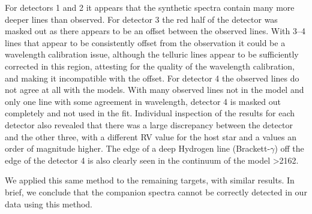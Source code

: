For detectors 1 and 2 it appears that the synthetic spectra contain many more deeper lines than observed.
For detector 3 the red half of the detector was masked out as there appears to be an offset between the observed lines.
With 3--4 lines that appear to be consistently offset from the observation it could be a wavelength calibration issue, although the telluric lines appear to be sufficiently corrected in this region, attesting for the quality of the wavelength calibration, and making it incompatible with the offset.
For detector 4 the observed lines do not agree at all with the models.
With many observed lines not in the model and only one line with some agreement in wavelength, detector 4 is masked out completely and not used in the \textchisquared{} fit.
Individual inspection of the \textchisquared{} results for each detector also revealed that there was a large discrepancy between the  detector and the other three, with a different {RV} value for the host star and a \textchisquared{} values an order of magnitude higher.
The edge of a deep Hydrogen line (Brackett-\(\gamma\)) off the edge of the detector 4 is also clearly seen in the continuum of the model >2162\nm{}.

We applied this same method to the remaining targets, with similar results.
In brief, we conclude that the companion spectra cannot be correctly detected in our data using this method.

